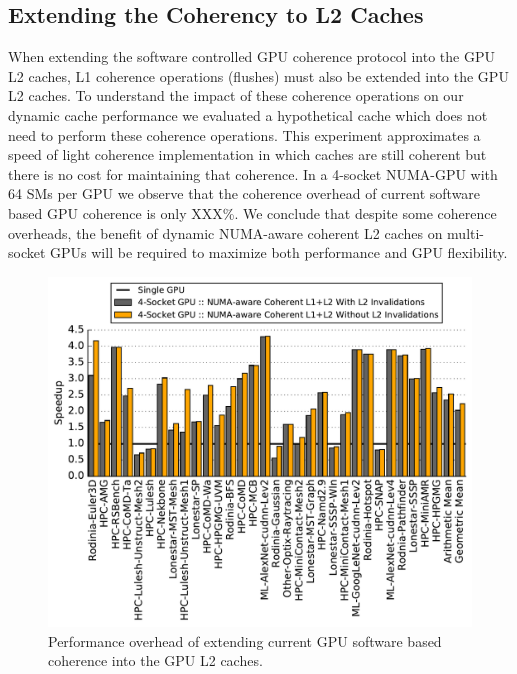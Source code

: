 

\subsection{Extending the Coherency to L2 Caches}

When extending the software controlled GPU coherence protocol into the GPU L2 
caches, L1 coherence operations (flushes) must also be extended into the GPU 
L2 caches.  To understand the impact of these coherence operations on our 
dynamic cache performance we evaluated a hypothetical cache which does not 
need to perform these coherence operations.  This experiment approximates a 
speed of light coherence implementation in which caches are still coherent 
but there is no cost for maintaining that coherence. In a 4-socket NUMA-GPU 
with 64 SMs per GPU we observe that the coherence overhead of current 
software based GPU coherence is only XXX\%. We conclude that despite some 
coherence overheads, the benefit of dynamic NUMA-aware coherent L2 caches on 
multi-socket GPUs will be required to maximize both performance and GPU 
flexibility. 

\begin{figure}[t]
    \centering
    \includegraphics[width=1.0\columnwidth]{figures/plot_no_inval_WB.pdf}
    \caption{Performance overhead of extending current GPU software based coherence
    into the GPU L2 caches.}
    \label{fig:invalidations}
\end{figure}
